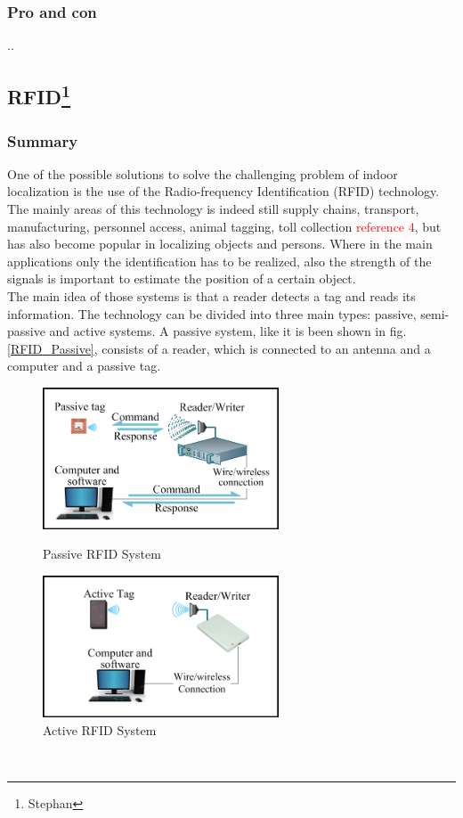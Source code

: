 \subsubsection*{Pro and con}
..

\subsection[RFIS]{RFID\footnote{Stephan}} %
\subsubsection*{Summary} 
One of the possible solutions to solve the challenging problem of indoor localization is the use of the Radio-frequency Identification (RFID) technology. The mainly areas of this technology is indeed still supply chains, transport, manufacturing, personnel access, animal tagging, toll collection \textcolor{red}{reference 4}, but has also become popular in localizing objects and persons. Where in the main applications only the identification has to be realized, also the strength of the signals is important to estimate the position of a certain object.\\
The main idea of those systems is that a reader detects a tag and reads its information. The technology can be divided into three main types: passive, semi-passive and active systems. A passive system, like it is been shown in fig. \ref{RFID_Passive}, consists of a reader, which is connected to an antenna and a computer and a passive tag.\\
\begin{figure}[!htbp]
\centering
\begin{minipage}{.5\textwidth}
\centering
\includegraphics[width = 7cm]{Pictures/RFID_Passive}%
\caption{Passive RFID System}
\label{RFID_Passive}
\end{minipage}%
\begin{minipage}{.5\textwidth}
\centering
\includegraphics[width = 7cm]{Pictures/RFID_Active}%
\caption{Active RFID System}
\label{RFID_Active}
\end{minipage}
\end{figure}\\
